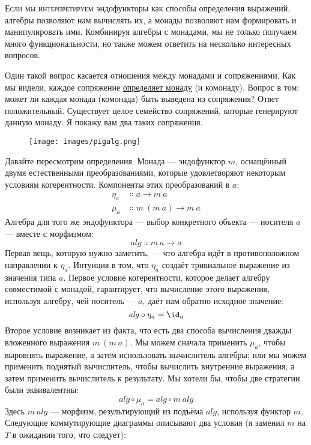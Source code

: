 
\lettrine[lhang=0.17]{Е}{сли мы интерпретируем} эндофункторы как способы определения выражений, алгебры
позволяют нам вычислять их, а монады позволяют нам формировать и манипулировать ими.
Комбинируя алгебры с монадами, мы не только получаем много функциональности,
но также можем ответить на несколько интересных вопросов.

Один такой вопрос касается отношения между монадами и сопряжениями.
Как мы видели, каждое сопряжение \hyperref[monads-categorically]{определяет
  монаду} (и комонаду). Вопрос в том: может ли каждая монада (комонада) быть
выведена из сопряжения? Ответ положительный. Существует целое
семейство сопряжений, которые генерируют данную монаду. Я покажу вам два
таких сопряжения.

\begin{figure}[H]
  \centering
  \texttt{[image: images/pigalg.png]}
\end{figure}

\noindent
Давайте пересмотрим определения. Монада --- эндофунктор $m$,
оснащённый двумя естественными преобразованиями, которые удовлетворяют некоторым условиям
когерентности. Компоненты этих преобразований в $a$:
\begin{align*}
  \eta_a & \Colon a \to m\ a         \\
  \mu_a  & \Colon m\ (m\ a) \to m\ a
\end{align*}
Алгебра для того же эндофунктора --- выбор конкретного
объекта --- носителя $a$ --- вместе с морфизмом:
\[\mathit{alg} \Colon m\ a \to a\]
Первая вещь, которую нужно заметить, --- что алгебра идёт в противоположном
направлении к $\eta_a$. Интуиция в том, что $\eta_a$ создаёт
тривиальное выражение из значения типа $a$. Первое условие когерентности,
которое делает алгебру совместимой с монадой, гарантирует, что
вычисление этого выражения, используя алгебру, чей носитель --- $a$,
даёт нам обратно исходное значение:
\[\mathit{alg} \circ \eta_a = \id_a\]
Второе условие возникает из факта, что есть два способа
вычисления дважды вложенного выражения $m\ (m\ a)$. Мы можем сначала
применить $\mu_a$, чтобы выровнять выражение, а затем использовать вычислитель
алгебры; или мы можем применить поднятый вычислитель, чтобы вычислить
внутренние выражения, а затем применить вычислитель к результату. Мы хотели бы,
чтобы две стратегии были эквивалентны:
\[\mathit{alg} \circ \mu_a = \mathit{alg} \circ m\ \mathit{alg}\]
Здесь $m\ \mathit{alg}$ --- морфизм, результирующий из подъёма
$\mathit{alg}$, используя функтор $m$. Следующие коммутирующие
диаграммы описывают два условия (я заменил $m$ на
$T$ в ожидании того, что следует):

